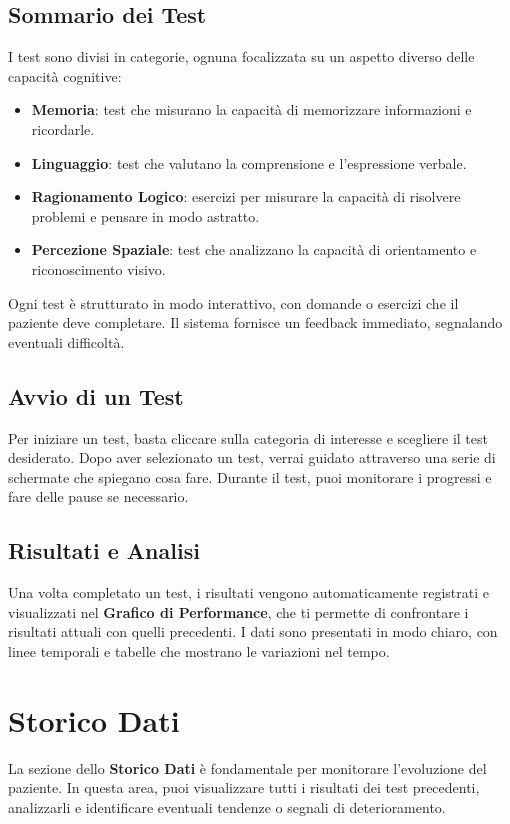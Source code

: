 \documentclass[a4paper,12pt]{book}
\begin{document}
	\subsection{Sommario dei Test}
	I test sono divisi in categorie, ognuna focalizzata su un aspetto diverso delle capacità cognitive:
	\begin{itemize}
		\item \textbf{Memoria}: test che misurano la capacità di memorizzare informazioni e ricordarle.
		\item \textbf{Linguaggio}: test che valutano la comprensione e l’espressione verbale.
		\item \textbf{Ragionamento Logico}: esercizi per misurare la capacità di risolvere problemi e pensare in modo astratto.
		\item \textbf{Percezione Spaziale}: test che analizzano la capacità di orientamento e riconoscimento visivo.
	\end{itemize}
	
	Ogni test è strutturato in modo interattivo, con domande o esercizi che il paziente deve completare. Il sistema fornisce un feedback immediato, segnalando eventuali difficoltà.
	
	\subsection{Avvio di un Test}
	Per iniziare un test, basta cliccare sulla categoria di interesse e scegliere il test desiderato. Dopo aver selezionato un test, verrai guidato attraverso una serie di schermate che spiegano cosa fare. Durante il test, puoi monitorare i progressi e fare delle pause se necessario.
	
	\subsection{Risultati e Analisi}
	Una volta completato un test, i risultati vengono automaticamente registrati e visualizzati nel \textbf{Grafico di Performance}, che ti permette di confrontare i risultati attuali con quelli precedenti. I dati sono presentati in modo chiaro, con linee temporali e tabelle che mostrano le variazioni nel tempo.
	
	\section{Storico Dati}
	La sezione dello \textbf{Storico Dati} è fondamentale per monitorare l'evoluzione del paziente. In questa area, puoi visualizzare tutti i risultati dei test precedenti, analizzarli e identificare eventuali tendenze o segnali di deterioramento.
	
\end{document}
